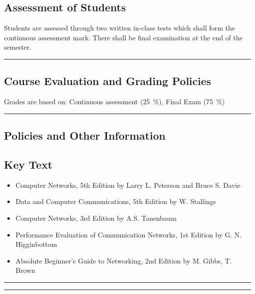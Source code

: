 \subsection*{Assessment of Students}
\begin{outline}
    \1 Students are assessed through two written in-class tests which shall form the continuous assessment mark.
    \1 There shall be final examination at the end of the semester.
\end{outline}
\vspace{2ex}\hrule\vspace{2ex}

\subsection*{Course Evaluation and Grading Policies}
Grades are based on:
Continuous assessment (\qty{25}{\percent}),
Final Exam (\qty{75}{\percent})
\vspace{2ex}\hrule\vspace{2ex}



\subsection*{Policies and Other Information}
\subsection*{Key Text}
\begin{itemize}
    \item Computer Networks, 5th Edition by Larry L. Peterson and Bruce S. Davie
    \item Data and Computer Communications, 5th Edition by W. Stallings
    \item Computer Networks, 3rd Edition by A.S. Tanenbaum
    \item Performance Evaluation of Communication Networks, 1st Edition by G. N. Higginbottom
    \item Absolute Beginner's Guide to Networking, 2nd Edition by M. Gibbs, T. Brown
\end{itemize}
\vspace{2ex}\hrule
\vspace{2ex}\hrule\vspace{2ex}